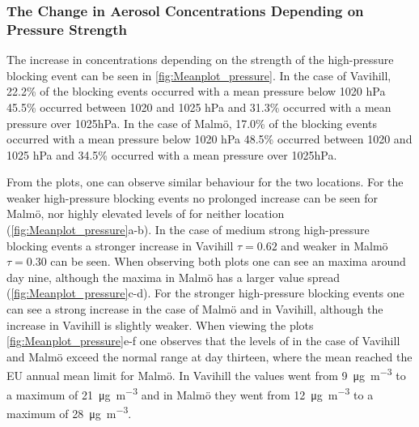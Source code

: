 \subsubsection{The Change in Aerosol Concentrations Depending on Pressure Strength}
The increase in \PM  concentrations depending on the strength of the high-pressure blocking event can be seen in \autoref{fig:Meanplot_pressure}. In the case of Vavihill, 22.2\% of the blocking events occurred with a mean pressure below 1020 hPa 45.5\% occurred between 1020 and 1025 hPa and 31.3\% occurred with a mean pressure over 1025hPa. In the case of Malmö, 17.0\% of the blocking events occurred with a mean pressure below 1020 hPa 48.5\% occurred between 1020 and 1025 hPa and 34.5\% occurred with a mean pressure over 1025hPa.


From the plots, one can observe similar behaviour for the two locations. For the weaker high-pressure blocking events no prolonged increase can be seen for Malmö, nor highly elevated levels of \PM for neither location (\autoref{fig:Meanplot_pressure}a-b). In the case of medium strong high-pressure blocking events a stronger increase in Vavihill $\tau=0.62$ and weaker in Malmö $\tau=0.30$ can be seen. When observing both plots one can see an maxima around day nine, although the maxima in Malmö has a larger value spread (\autoref{fig:Meanplot_pressure}c-d). For the stronger high-pressure blocking events one can see a strong increase in the case of Malmö and in Vavihill, although the increase in Vavihill is slightly weaker. When viewing the plots \autoref{fig:Meanplot_pressure}e-f one observes that the levels of \PM in the case of Vavihill and Malmö exceed the normal range at day thirteen, where the mean reached the EU annual mean limit for Malmö. In Vavihill the values went from \SI{9}{\micro\gram\per\meter\cubed} to a maximum of \SI{21}{\micro\gram\per\meter\cubed} and in Malmö they went from \SI{12}{\micro\gram\per\meter\cubed} to a maximum of \SI{28}{\micro\gram\per\meter\cubed}. 


